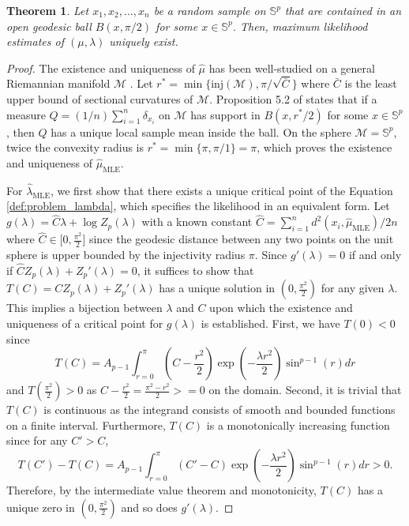 \documentclass[11pt]{article}
\newtheorem{theorem}{Theorem}[section]
\newcommand{\calM}{\mathcal{M}}
\newcommand{\bbS}{\mathbb{S}}
\begin{document}
\begin{theorem}\label{thm:hadamard}
	Let $x_1,x_2,\ldots,x_n$ be a random sample on $\bbS^p$ that are contained in an open geodesic ball $B(x, \pi/2)$ for some $x \in \bbS^p$. Then, maximum likelihood estimates of $(\mu,\lambda)$ uniquely exist. 
\end{theorem} 
\begin{proof}
	The existence and uniqueness of $\hat{\mu}$ has been well-studied on a general Riemannian manifold $\calM$ \citep{kendall_probability_1990-1, nielsen_medians_2013}. Let $r^* = \min \lbrace \text{inj}(\calM), \pi/\sqrt{\bar{C}} \rbrace$ where $\bar{C}$ is the least upper bound of sectional curvatures of $\calM$.  Proposition 5.2 of \cite{bhattacharya_nonparametric_2012-1} states that if a measure $Q= (1/n) \sum_{i=1}^n \delta_{x_i}$ on $\calM$ has support in $B(x, r^*/2)$ for some $x \in \bbS^p$, then $Q$ has a unique local sample mean inside the ball. On the sphere $\calM = \bbS^p$, twice the convexity radius is $r^* = \min \lbrace \pi, \pi/1 \rbrace = \pi$, which proves the existence and uniqueness of $\hat{\mu}_{\text{MLE}}$.
	
	For $\hat{\lambda}_{\text{MLE}}$, we first show that there exists a unique critical point of the Equation \eqref{def:problem_lambda}, which specifies the likelihood in an equivalent form. Let $g(\lambda) = \hat{C} \lambda + \log Z_p (\lambda)$ with a known constant $\hat{C} = \sum_{i=1}^n d^2 (x_i, \hat{\mu}_{\text{MLE}}) / 2n$ where $\hat{C} \in \lbrack 0, \frac{\pi^2}{2}\rbrack$ since the geodesic distance between any two points on the unit sphere is upper bounded by the injectivity radius $\pi$. Since $g'(\lambda) = 0$ if and only if $\hat{C} Z_p (\lambda) + Z_p ' (\lambda) = 0$, it suffices to show that $T(C) = C Z_p (\lambda) + Z_p '(\lambda)$ has a unique solution in $( 0, \frac{\pi^2}{2} )$ for any given $\lambda$. This implies a bijection between $\lambda$ and $C$ upon which the existence and uniqueness of a critical point for $g(\lambda)$ is established. First, we have $T(0) < 0$ since 
	\begin{equation}\label{eq:auxiliary}
	T(C) = A_{p-1} \int_{r=0}^\pi \left(C - \frac{r^2}{2}\right) \exp\left(-\frac{\lambda r^2}{2}\right) \sin^{p-1}(r)dr
	\end{equation}
	and $T(\frac{\pi^2}{2}) > 0$ as $C - \frac{r^2}{2} = \frac{\pi^2 - r^2}{2} >= 0$ on the domain. Second, it is trivial that $T(C)$ is continuous as the integrand consists of smooth and bounded functions on a finite interval. Furthermore, $T(C)$ is a monotonically increasing function since for any $C' > C$,
	\begin{equation*}
	T(C')-T(C) = A_{p-1} \int_{r=0}^\pi \left(C'-C\right) \exp\left(-\frac{\lambda r^2}{2}\right) \sin^{p-1}(r)dr > 0.
	\end{equation*}
	Therefore, by the intermediate value theorem and  monotonicity, $T(C)$ has a unique zero in $( 0, \frac{\pi^2}{2} )$ and so does $g'(\lambda)$.
	

\end{proof}
\end{document}
